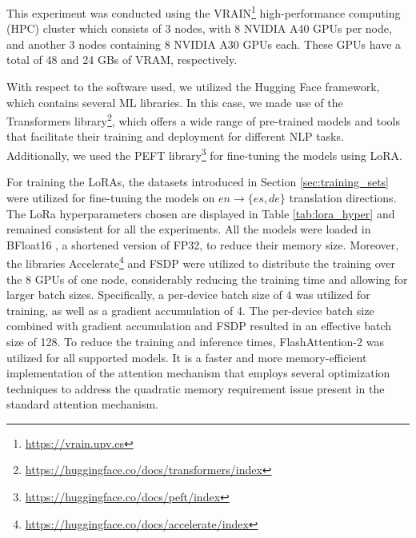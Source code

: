 \documentclass[11pt,english,listoffigures,listoftables]{tfgetsinf}
\begin{document}
This experiment was conducted using the VRAIN\footnote{\url{https://vrain.upv.es}} high-performance computing (HPC) cluster which consists of 3 nodes, with 8 NVIDIA A40 GPUs per node, and another 3 nodes containing 8 NVIDIA A30 GPUs each. These GPUs have a total of 48 and 24 GBs of VRAM, respectively.

With respect to the software used, we utilized the Hugging Face framework, which contains several ML libraries. In this case, we made use of the Transformers library\footnote{\url{https://huggingface.co/docs/transformers/index}}, which offers a wide range of pre-trained models and tools that facilitate their training and deployment for different NLP tasks. Additionally, we used the PEFT library\footnote{\url{https://huggingface.co/docs/peft/index}} for fine-tuning the models using LoRA.

For training the LoRAs, the datasets introduced in Section \ref{sec:training_sets} were utilized for fine-tuning the models on $en \rightarrow \{es,de\}$ translation directions. The LoRa hyperparameters chosen are displayed in Table \ref{tab:lora_hyper} and remained consistent for all the experiments. All the models were loaded in BFloat16 \cite{kalamkar2019bf16}, a shortened version of FP32, to reduce their memory size. Moreover, the libraries Accelerate\footnote{\url{https://huggingface.co/docs/accelerate/index}} and FSDP \cite{zhao2023fsdp} were utilized to distribute the training over the 8 GPUs of one node, considerably reducing the training time and allowing for larger batch sizes. Specifically, a per-device batch size of 4 was utilized for training, as well as a gradient accumulation of 4. The per-device batch size combined with gradient accumulation and FSDP resulted in an effective batch size of 128. To reduce the training and inference times, FlashAttention-2 \cite{dao2023flashattention} was utilized for all supported models. It is a faster and more memory-efficient implementation of the attention mechanism that employs several optimization techniques to address the quadratic memory requirement issue present in the standard attention mechanism.
\end{document}
